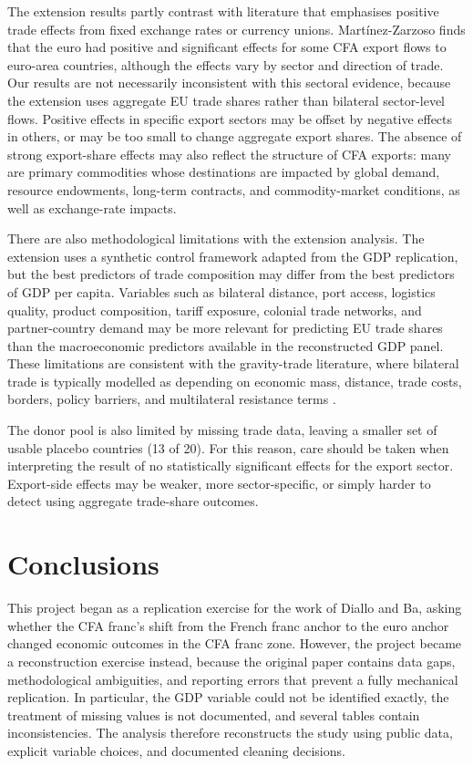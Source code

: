 \documentclass[a4paper]{article}
\begin{document}
The extension results partly contrast with literature that emphasises positive trade effects from fixed exchange rates or currency unions. Martínez-Zarzoso finds that the euro had positive and significant effects for some CFA export flows to euro-area countries, although the effects vary by sector and direction of trade. Our results are not necessarily inconsistent with this sectoral evidence, because the extension uses aggregate EU trade shares rather than bilateral sector-level flows. Positive effects in specific export sectors may be offset by negative effects in others, or may be too small to change aggregate export shares. The absence of strong export-share effects may also reflect the structure of CFA exports: many are primary commodities whose destinations are impacted by global demand, resource endowments, long-term contracts, and commodity-market conditions, as well as exchange-rate impacts.

There are also methodological limitations with the extension analysis. The extension uses a synthetic control framework adapted from the GDP replication, but the best predictors of trade composition may differ from the best predictors of GDP per capita. Variables such as bilateral distance, port access, logistics quality, product composition, tariff exposure, colonial trade networks, and partner-country demand may be more relevant for predicting EU trade shares than the macroeconomic predictors available in the reconstructed GDP panel. These limitations are consistent with the gravity-trade literature, where bilateral trade is typically modelled as depending on economic mass, distance, trade costs, borders, policy barriers, and multilateral resistance terms \citep{anderson2003gravity,head2014gravity}.

The donor pool is also limited by missing trade data, leaving a smaller set of usable placebo countries (13 of 20). For this reason, care should be taken when interpreting the result of no statistically significant effects for the export sector. Export-side effects may be weaker, more sector-specific, or simply harder to detect using aggregate trade-share outcomes.

\section{Conclusions}
This project began as a replication exercise for the work of Diallo and Ba, asking whether the CFA franc's shift from the French franc anchor to the euro anchor changed economic outcomes in the CFA franc zone. However, the project became a reconstruction exercise instead, because the original paper contains data gaps, methodological ambiguities, and reporting errors that prevent a fully mechanical replication. In particular, the GDP variable could not be identified exactly, the treatment of missing values is not documented, and several tables contain inconsistencies. The analysis therefore reconstructs the study using public data, explicit variable choices, and documented cleaning decisions.
\end{document}

